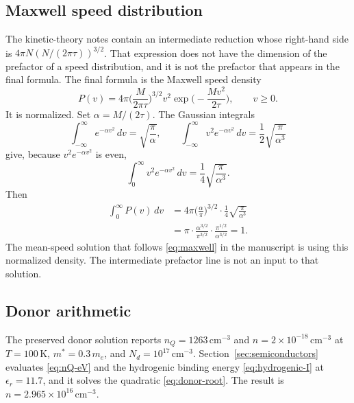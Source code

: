 \subsection{Maxwell speed distribution}
\label{sec:maxwell-norm}

The kinetic-theory notes contain an intermediate reduction whose right-hand side is \(4\pi N (N/(2\pi\tau))^{3/2}\). That expression does not have the dimension of the prefactor of a speed distribution, and it is not the prefactor that appears in the final formula. The final formula is the Maxwell speed density
\begin{equation}
\label{eq:maxwell}
P(v) = 4\pi\biggl(\frac{M}{2\pi\tau}\biggr)^{3/2} v^2 \exp\biggl(-\frac{M v^2}{2\tau}\biggr),
\qquad v\ge 0.
\end{equation}
It is normalized. Set \(\alpha = M/(2\tau)\). The Gaussian integrals
\begin{equation}
\label{eq:gaussian-moments}
\int_{-\infty}^{\infty} e^{-\alpha v^2}\, dv = \sqrt{\frac{\pi}{\alpha}},
\qquad
\int_{-\infty}^{\infty} v^2 e^{-\alpha v^2}\, dv = \frac{1}{2}\sqrt{\frac{\pi}{\alpha^3}}
\end{equation}
give, because \(v^2 e^{-\alpha v^2}\) is even,
\begin{equation}
\label{eq:half-moment}
\int_{0}^{\infty} v^2 e^{-\alpha v^2}\, dv = \frac{1}{4}\sqrt{\frac{\pi}{\alpha^3}}.
\end{equation}
Then
\begin{align}
\int_{0}^{\infty} P(v)\, dv
&= 4\pi\biggl(\frac{\alpha}{\pi}\biggr)^{3/2}\cdot\frac{1}{4}\sqrt{\frac{\pi}{\alpha^3}} \nonumber\\
&= \pi\cdot\frac{\alpha^{3/2}}{\pi^{3/2}}\cdot\frac{\pi^{1/2}}{\alpha^{3/2}}
= 1.
\label{eq:maxwell-normalized}
\end{align}
The mean-speed solution that follows \eqref{eq:maxwell} in the manuscript is using this normalized density. The intermediate prefactor line is not an input to that solution.

\subsection{Donor arithmetic}
\label{sec:donor-pointer}

The preserved donor solution reports \(n_Q = 1263\,\mathrm{cm}^{-3}\) and \(n = 2\times 10^{-18}\,\mathrm{cm}^{-3}\) at \(T=100\,\mathrm{K}\), \(m^{\!*}=0.3\, m_e\), and \(N_d = 10^{17}\,\mathrm{cm}^{-3}\). Section~\ref{sec:semiconductors} evaluates \eqref{eq:nQ-eV} and the hydrogenic binding energy \eqref{eq:hydrogenic-I} at \(\epsilon_r = 11.7\), and it solves the quadratic \eqref{eq:donor-root}. The result is \(n = 2.965\times 10^{16}\,\mathrm{cm}^{-3}\).

